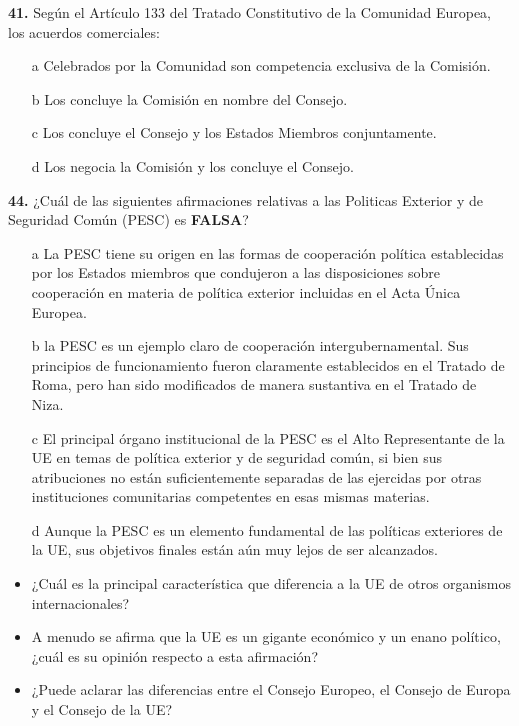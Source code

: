\documentclass{nuevotema}
\begin{document}

\textbf{41.} Según el Artículo 133 del Tratado Constitutivo de la Comunidad Europea, los acuerdos comerciales:
\begin{enumerate}
	\item[a] Celebrados por la Comunidad son competencia exclusiva de la Comisión.
	\item[b] Los concluye la Comisión en nombre del Consejo.
	\item[c] Los concluye el Consejo y los Estados Miembros conjuntamente.
	\item[d] Los negocia la Comisión y los concluye el Consejo.
\end{enumerate}

\textbf{44.} ¿Cuál de las siguientes afirmaciones relativas a las Politicas Exterior y de Seguridad Común (PESC) es \textbf{FALSA}?
\begin{enumerate}
	\item[a] La PESC tiene su origen en las formas de cooperación política establecidas por los Estados miembros que condujeron a las disposiciones sobre cooperación en materia de política exterior incluidas en el Acta Única Europea.
	\item[b] la PESC es un ejemplo claro de cooperación intergubernamental. Sus principios de funcionamiento fueron claramente establecidos en el Tratado de Roma, pero han sido modificados de manera sustantiva en el Tratado de Niza.
	\item[c] El principal órgano institucional de la PESC es el Alto Representante de la UE en temas de política exterior y de seguridad común, si bien sus atribuciones no están suficientemente separadas de las ejercidas por otras instituciones comunitarias competentes en esas mismas materias.
	\item[d] Aunque la PESC es un elemento fundamental de las políticas exteriores de la UE, sus objetivos finales están aún muy lejos de ser alcanzados. 
\end{enumerate}

\begin{itemize}
    \item ¿Cuál es la principal característica que diferencia a la UE de otros organismos internacionales?
    \item A menudo se afirma que la UE es un gigante económico y un enano político, ¿cuál es su opinión respecto a esta afirmación?     
    \item ¿Puede aclarar las diferencias entre el Consejo Europeo, el Consejo de Europa y el Consejo de la UE?
\end{itemize}
\end{document}
